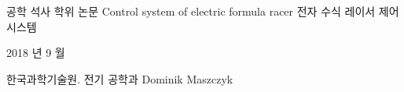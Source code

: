 \thispagestyle{empty} %
\frieze

\begin{CJK}{UTF8}{mj}
\begin{center}
공학 석사 학위 논문
Control system of electric formula racer
전자 수식 레이서 제어 시스템

2018 년 9 월

한국과학기술원.
전기 공학과
Dominik Maszczyk
\end{center}
\end{CJK}

